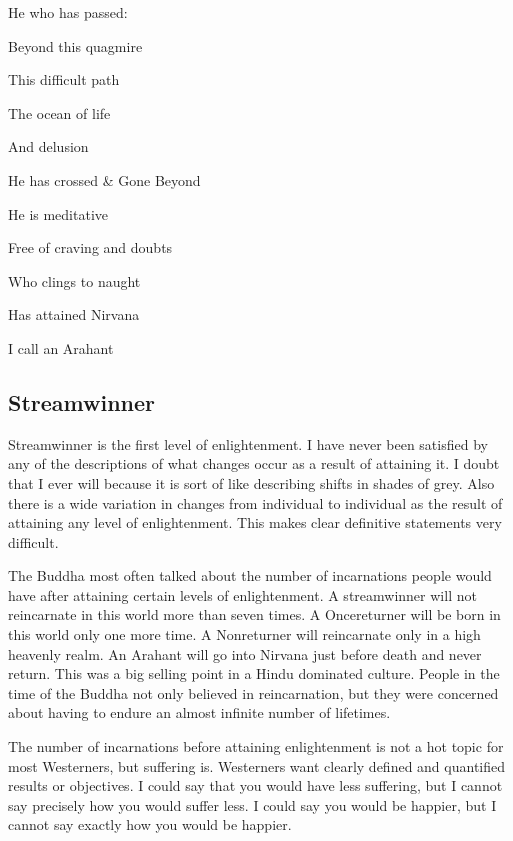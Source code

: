 \documentclass[a5paper,10pt,english]{book}
\begin{document}
\begin{DUlineblock}{0em}
\item[] 
\item[] He who has passed:
\item[] Beyond this quagmire
\item[] This difficult path
\item[] The ocean of life
\item[] And delusion
\item[] He has crossed \& Gone Beyond
\item[] He is meditative
\item[] Free of craving and doubts
\item[] Who clings to naught
\item[] Has attained Nirvana
\item[] I call an Arahant
\end{DUlineblock}


\subsection{Stream\sphinxhyphen{}winner}
\label{\detokenize{saints:stream-winner}}
\sphinxAtStartPar
Stream\sphinxhyphen{}winner is the first level of enlightenment. I have never been
satisfied by any of the descriptions of what changes occur as a result
of attaining it. I doubt that I ever will because it is sort of like
describing shifts in shades of grey. Also there is a wide variation in
changes from individual to individual as the result of attaining any
level of enlightenment. This makes clear definitive statements very
difficult.

\sphinxAtStartPar
The Buddha most often talked about the number of incarnations people
would have after attaining certain levels of enlightenment. A
stream\sphinxhyphen{}winner will not reincarnate in this world more than seven times.
A Once\sphinxhyphen{}returner will be born in this world only one more time. A
Non\sphinxhyphen{}returner will reincarnate only in a high heavenly realm. An Arahant
will go into Nirvana just before death and never return. This was a big
selling point in a Hindu dominated culture. People in the time of the
Buddha not only believed in reincarnation, but they were concerned about
having to endure an almost infinite number of lifetimes.

\sphinxAtStartPar
The number of incarnations before attaining enlightenment is not a hot
topic for most Westerners, but suffering is. Westerners want clearly
defined and quantified results or objectives. I could say that you would
have less suffering, but I cannot say precisely how you would suffer
less. I could say you would be happier, but I cannot say exactly how you
would be happier.
\end{document}
